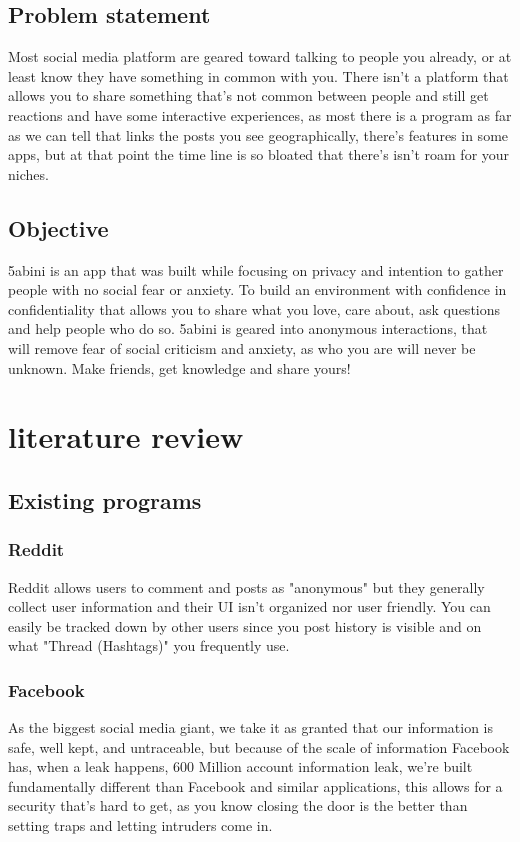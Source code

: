 \documentclass[12pt]{article}
\begin{document}
\subsection{Problem statement}
Most social media platform are geared toward talking to people you already, or at least know they have something in common with you. There isn't a platform that allows you to share something that's not common between people and still get reactions and have some interactive experiences, as most there is a program as far as we can tell that links the posts you see geographically, there's features in some apps, but at that point the time line is so bloated that there's isn't roam for your niches.\\ 
\subsection{Objective}
5abini is an app that was built while focusing on privacy and intention to gather people with no social fear or anxiety. To  build an environment with confidence in confidentiality that allows you to share what you love, care about, ask questions and help people who do so. 5abini is geared into anonymous interactions, that will remove fear of social criticism and anxiety, as who you are will never be unknown. Make friends, get knowledge and share yours!



\section{literature review}
\subsection{Existing programs}
\subsubsection{Reddit}
Reddit allows users to comment and posts as "anonymous" but they generally collect user information and their UI isn't organized nor user friendly. You can easily be tracked down by other users since you post history is visible and on what "Thread (Hashtags)" you frequently use.
\subsubsection{Facebook}
As the biggest social media giant, we take it as granted that our information is safe, well kept, and untraceable, but because of the scale of information Facebook has, when a leak happens, 600 Million account information leak, we're built fundamentally different than Facebook and similar applications, this allows for a security that's hard to get, as you know closing the door is the better than setting traps and letting intruders come in.
\end{document}
